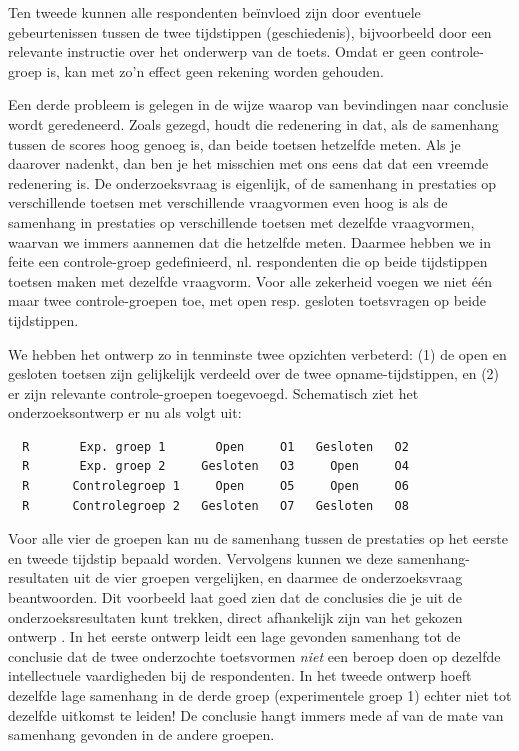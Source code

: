 \documentclass[
]{book}
\begin{document}
Ten tweede kunnen alle respondenten beïnvloed zijn door eventuele
gebeurtenissen tussen de twee tijdstippen (geschiedenis), bijvoorbeeld
door een relevante instructie over het onderwerp van de toets. Omdat er
geen controle-groep is, kan met zo'n effect geen rekening worden
gehouden.

Een derde probleem is gelegen in de wijze waarop van bevindingen naar
conclusie wordt geredeneerd. Zoals gezegd, houdt die redenering in dat,
als de samenhang tussen de scores hoog genoeg is, dan beide toetsen
hetzelfde meten. Als je daarover nadenkt, dan ben je het misschien met
ons eens dat dat een vreemde redenering is. De onderzoeksvraag is
eigenlijk, of de samenhang in prestaties op verschillende toetsen met
verschillende vraagvormen even hoog is als de samenhang in prestaties op
verschillende toetsen met dezelfde vraagvormen, waarvan we immers
aannemen dat die hetzelfde meten. Daarmee hebben we in feite een
controle-groep gedefinieerd, nl. respondenten die op beide tijdstippen
toetsen maken met dezelfde vraagvorm. Voor alle zekerheid voegen we niet
één maar twee controle-groepen toe, met open resp. gesloten toetsvragen
op beide tijdstippen.

We hebben het ontwerp zo in tenminste twee opzichten verbeterd: (1) de open en gesloten
toetsen zijn gelijkelijk verdeeld over de twee opname-tijdstippen, en (2) er zijn
relevante controle-groepen toegevoegd. Schematisch ziet het
onderzoeksontwerp er nu als volgt uit:

\begin{verbatim}
  R       Exp. groep 1       Open     O1   Gesloten   O2
  R       Exp. groep 2     Gesloten   O3     Open     O4
  R      Controlegroep 1     Open     O5     Open     O6
  R      Controlegroep 2   Gesloten   O7   Gesloten   O8
\end{verbatim}

Voor alle vier de groepen kan nu de samenhang tussen de prestaties op
het eerste en tweede tijdstip bepaald worden. Vervolgens kunnen we deze
samenhang-resultaten uit de vier groepen vergelijken, en daarmee de
onderzoeksvraag beantwoorden. Dit voorbeeld laat goed zien dat de
conclusies die je uit de onderzoeksresultaten kunt trekken, direct
afhankelijk zijn van het gekozen ontwerp \citep{Levin99}. In het eerste
ontwerp leidt een lage gevonden samenhang tot de conclusie dat de twee
onderzochte toetsvormen \emph{niet} een beroep doen op dezelfde intellectuele
vaardigheden bij de respondenten. In het tweede ontwerp hoeft dezelfde
lage samenhang in de derde groep (experimentele groep 1) echter niet tot
dezelfde uitkomst te leiden! De conclusie hangt immers mede af van de
mate van samenhang gevonden in de andere groepen.
\end{document}
